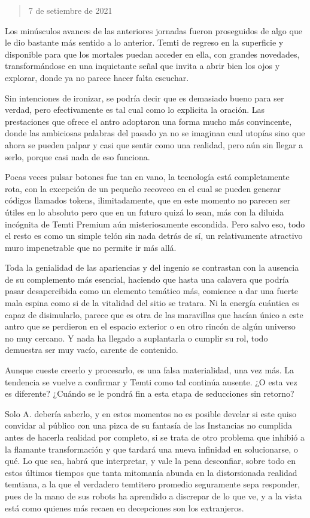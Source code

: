 \documentclass[
]{book}
\begin{document}
\begin{quote}
7 de setiembre de 2021
\end{quote}

Los minúsculos avances de las anteriores jornadas fueron proseguidos de algo que le dio bastante más sentido a lo anterior. Temti de regreso en la superficie y disponible para que los mortales puedan acceder en ella, con grandes novedades, transformándose en una inquietante señal que invita a abrir bien los ojos y explorar, donde ya no parece hacer falta escuchar.

Sin intenciones de ironizar, se podría decir que es demasiado bueno para ser verdad, pero efectivamente es tal cual como lo explicita la oración. Las prestaciones que ofrece el antro adoptaron una forma mucho más convincente, donde las ambiciosas palabras del pasado ya no se imaginan cual utopías sino que ahora se pueden palpar y casi que sentir como una realidad, pero aún sin llegar a serlo, porque casi nada de eso funciona.

Pocas veces pulsar botones fue tan en vano, la tecnología está completamente rota, con la excepción de un pequeño recoveco en el cual se pueden generar códigos llamados tokens, ilimitadamente, que en este momento no parecen ser útiles en lo absoluto pero que en un futuro quizá lo sean, más con la diluida incógnita de Temti Premium aún misteriosamente escondida. Pero salvo eso, todo el resto es como un simple telón sin nada detrás de sí, un relativamente atractivo muro impenetrable que no permite ir más allá.

Toda la genialidad de las apariencias y del ingenio se contrastan con la ausencia de su complemento más esencial, haciendo que hasta una calavera que podría pasar desapercibida como un elemento temático más, comience a dar una fuerte mala espina como si de la vitalidad del sitio se tratara. Ni la energía cuántica es capaz de disimularlo, parece que es otra de las maravillas que hacían único a este antro que se perdieron en el espacio exterior o en otro rincón de algún universo no muy cercano. Y nada ha llegado a suplantarla o cumplir su rol, todo demuestra ser muy vacío, carente de contenido.

Aunque cueste creerlo y procesarlo, es una falsa materialidad, una vez más. La tendencia se vuelve a confirmar y Temti como tal continúa ausente. ¿O esta vez es diferente? ¿Cuándo se le pondrá fin a esta etapa de seducciones sin retorno?

Solo A. debería saberlo, y en estos momentos no es posible develar si este quiso convidar al público con una pizca de su fantasía de las Instancias no cumplida antes de hacerla realidad por completo, si se trata de otro problema que inhibió a la flamante transformación y que tardará una nueva infinidad en solucionarse, o qué. Lo que sea, habrá que interpretar, y vale la pena desconfiar, sobre todo en estos últimos tiempos que tanta mitomanía abunda en la distorsionada realidad temtiana, a la que el verdadero temtitero promedio seguramente sepa responder, pues de la mano de sus robots ha aprendido a discrepar de lo que ve, y a la vista está como quienes más recaen en decepciones son los extranjeros.
\end{document}
